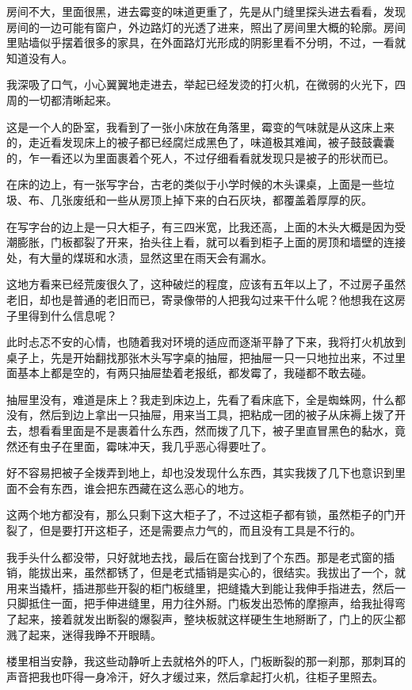 房间不大，里面很黑，进去霉变的味道更重了，先是从门缝里探头进去看看，发现房间的一边可能有窗户，外边路灯的光透了进来，照出了房间里大概的轮廓。房间里贴墙似乎摆着很多的家具，在外面路灯光形成的阴影里看不分明，不过，一看就知道没有人。

我深吸了口气，小心翼翼地走进去，举起已经发烫的打火机，在微弱的火光下，四周的一切都清晰起来。

这是一个人的卧室，我看到了一张小床放在角落里，霉变的气味就是从这床上来的，走近看发现床上的被子都已经腐烂成黑色了，味道极其难闻，被子鼓鼓囊囊的，乍一看还以为里面裹着个死人，不过仔细看看就发现只是被子的形状而已。

在床的边上，有一张写字台，古老的类似于小学时候的木头课桌，上面是一些垃圾、布、几张废纸和一些从房顶上掉下来的白石灰块，都覆盖着厚厚的灰。

在写字台的边上是一只大柜子，有三四米宽，比我还高，上面的木头大概是因为受潮膨胀，门板都裂了开来，抬头往上看，就可以看到柜子上面的房顶和墙壁的连接处，有大量的煤斑和水渍，显然这里在雨天会有漏水。

这地方看来已经荒废很久了，这种破烂的程度，应该有五年以上了，不过房子虽然老旧，却也是普通的老旧而已，寄录像带的人把我勾过来干什么呢？他想我在这房子里得到什么信息呢？

此时忐忑不安的心情，也随着我对环境的适应而逐渐平静了下来，我将打火机放到桌子上，先是开始翻找那张木头写字桌的抽屉，把抽屉一只一只地拉出来，不过里面基本上都是空的，有两只抽屉垫着老报纸，都发霉了，我碰都不敢去碰。

抽屉里没有，难道是床上？我走到床边上，先看了看床底下，全是蜘蛛网，什么都没有，然后到边上拿出一只抽屉，用来当工具，把粘成一团的被子从床褥上拨了开去，想看看里面是不是裹着什么东西，然而拨了几下，被子里直冒黑色的黏水，竟然还有虫子在里面，霉味冲天，我几乎恶心得要吐了。

好不容易把被子全拨弄到地上，却也没发现什么东西，其实我拨了几下也意识到里面不会有东西，谁会把东西藏在这么恶心的地方。

这两个地方都没有，那么只剩下这大柜子了，不过这柜子都有锁，虽然柜子的门开裂了，但是要打开这柜子，还是需要点力气的，而且没有工具是不行的。

我手头什么都没带，只好就地去找，最后在窗台找到了个东西。那是老式窗的插销，能拔出来，虽然都锈了，但是老式插销是实心的，很结实。我拔出了一个，就用来当撬杆，插进那些开裂的柜门板缝里，把缝撬大到能让我伸手指进去，然后一只脚抵住一面，把手伸进缝里，用力往外掰。门板发出恐怖的摩擦声，给我扯得弯了起来，接着就发出断裂的爆裂声，整块板就这样硬生生地掰断了，门上的灰尘都溅了起来，迷得我睁不开眼睛。

楼里相当安静，我这些动静听上去就格外的吓人，门板断裂的那一刹那，那刺耳的声音把我也吓得一身冷汗，好久才缓过来，然后拿起打火机，往柜子里照去。

